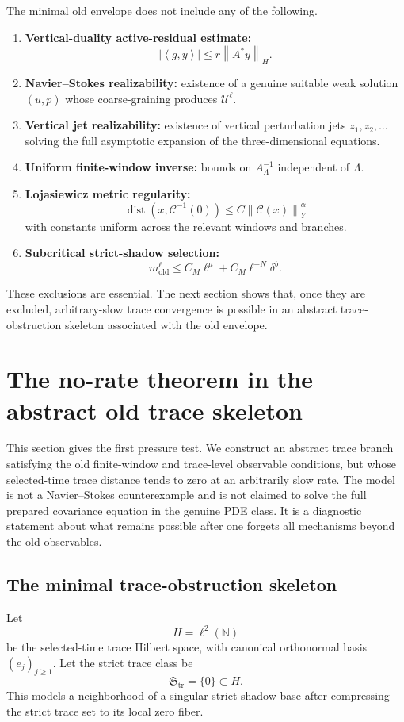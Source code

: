 \documentclass[11pt]{article}
\numberwithin{equation}{section}
\DeclareMathOperator{\dist}{dist}
\newcommand{\N}{\mathbb N}
\newcommand{\old}{\mathrm{old}}
\newcommand{\norm}[2]{\left\|#1\right\|_{#2}}
\newcommand{\ip}[2]{\left\langle #1,#2\right\rangle}
\newcommand{\calC}{\mathcal C}
\newcommand{\calU}{\mathcal U}
\newcommand{\frakS}{\mathfrak S}
\begin{document}
The minimal old envelope does not include any of the following.
\begin{enumerate}[label=(E\arabic*)]
\item \textbf{Vertical-duality active-residual estimate:}
\[
|\ip{g}{y}|
\le r\norm{A^*y}{H}.
\]
\item \textbf{Navier--Stokes realizability:} existence of a genuine suitable weak solution \((u,p)\) whose coarse-graining produces \(\calU^\ell\).
\item \textbf{Vertical jet realizability:} existence of vertical perturbation jets \(z_1,z_2,\ldots\) solving the full asymptotic expansion of the three-dimensional equations.
\item \textbf{Uniform finite-window inverse:} bounds on \(A_\Lambda^{-1}\) independent of \(\Lambda\).
\item \textbf{Lojasiewicz metric regularity:}
\[
\dist(x,\calC^{-1}(0))\le C\norm{\calC(x)}{Y}^\alpha
\]
with constants uniform across the relevant windows and branches.
\item \textbf{Subcritical strict-shadow selection:}
\[
m^\ell_{\old}\le C_M\ell^\mu+C_M\ell^{-N}\delta^b.
\]
\end{enumerate}
These exclusions are essential.  The next section shows that, once they are excluded, arbitrary-slow trace convergence is possible in an abstract trace-obstruction skeleton associated with the old envelope.

\section{The no-rate theorem in the abstract old trace skeleton}\label{sec:no-rate}

This section gives the first pressure test.  We construct an abstract trace branch satisfying the old finite-window and trace-level observable conditions, but whose selected-time trace distance tends to zero at an arbitrarily slow rate.  The model is not a Navier--Stokes counterexample and is not claimed to solve the full prepared covariance equation in the genuine PDE class.  It is a diagnostic statement about what remains possible after one forgets all mechanisms beyond the old observables.

\subsection{The minimal trace-obstruction skeleton}

Let
\[
H=\ell^2(\N)
\]
be the selected-time trace Hilbert space, with canonical orthonormal basis \((e_j)_{j\ge1}\).  Let the strict trace class be
\[
\frakS_{\mathrm{tr}}=\{0\}\subset H.
\]
This models a neighborhood of a singular strict-shadow base after compressing the strict trace set to its local zero fiber.
\end{document}
